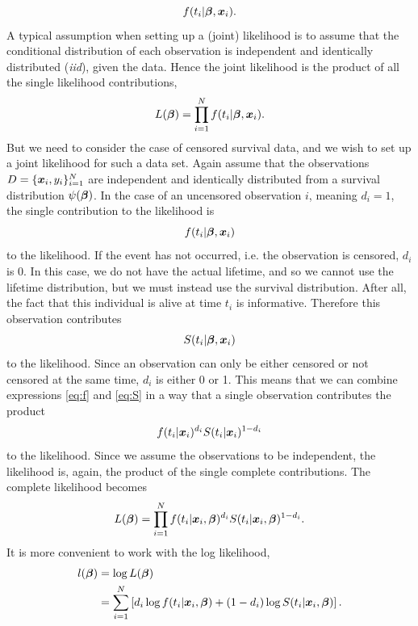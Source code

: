 \begin{equation*}
    f(t_i|\boldsymbol{\beta},\bm{x}_i).
\end{equation*}
A typical assumption when setting up a (joint) likelihood is to assume that the conditional distribution of each observation is independent and identically distributed (\textit{iid}), given the data.
Hence the joint likelihood is the product of all the single likelihood contributions,
\begin{equation*}
    L(\boldsymbol{\beta})=\prod_{i=1}^N f(t_i|\boldsymbol{\beta},\bm{x}_i).
\end{equation*}
But we need to consider the case of censored survival data, and we wish to set up a joint likelihood for such a data set.
Again assume that the observations $D=\{\bm{x}_i,y_i\}_{i=1}^N$ are independent and identically distributed from a survival distribution $\psi(\boldsymbol{\beta})$.
In the case of an uncensored observation $i$, meaning $d_i=1$, the single contribution to the likelihood is
\begin{equation}\label{eq:f}
    f(t_i|\boldsymbol{\beta},\bm{x}_{i})
\end{equation}
to the likelihood.
If the event has not occurred, i.e. the observation is censored, $d_i$ is 0.
In this case, we do not have the actual lifetime, and so we cannot use the lifetime distribution, but we must instead use the survival distribution.
After all, the fact that this individual is alive at time $t_i$ is informative.
Therefore this observation contributes
\begin{equation}\label{eq:S}
    S(t_i|\boldsymbol{\beta},\bm{x}_{i})
\end{equation}
to the likelihood.
Since an observation can only be either censored or not censored at the same time, $d_i$ is either 0 or 1.
This means that we can combine expressions \eqref{eq:f} and \eqref{eq:S} in a way that a single observation contributes the product
\begin{equation*}
    f(t_{i}|\bm{x}_i)^{d_i}S(t_{i}|\bm{x}_i)^{1-d_i}
\end{equation*}
to the likelihood.
Since we assume the observations to be independent, the likelihood is, again, the product of the single complete contributions.
The complete likelihood becomes
\begin{equation}\label{eq:surv-lik}
    L(\boldsymbol{\beta})=\prod_{i=1}^N f(t_i|\bm{x}_i,\boldsymbol{\beta})^{d_i} S(t_i|\bm{x}_i,\boldsymbol{\beta})^{1-d_i}.
\end{equation}
It is more convenient to work with the log likelihood,
\begin{align}\label{eq:surv-log-lik-1}
\begin{split}
    l(\boldsymbol{\beta})&=\log L(\boldsymbol{\beta}) \\
    &=\sum_{i=1}^N\left[ d_i \log f(t_i|\bm{x}_i,\boldsymbol{\beta}) + (1-d_i)\log S(t_i|\bm{x}_i,\boldsymbol{\beta})\right].
\end{split}
\end{align}
